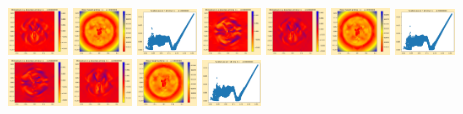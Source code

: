 \documentclass[11pt]{article}
\begin{document}
\includegraphics[width=0.11875\textwidth]{frame0040fig3.png}
\includegraphics[width=0.11875\textwidth]{frame0041fig0.png}
\includegraphics[width=0.11875\textwidth]{frame0041fig1.png}
\includegraphics[width=0.11875\textwidth]{frame0041fig2.png}
\includegraphics[width=0.11875\textwidth]{frame0041fig3.png}
\vskip 10pt 
\includegraphics[width=0.11875\textwidth]{frame0042fig0.png}
\includegraphics[width=0.11875\textwidth]{frame0042fig1.png}
\includegraphics[width=0.11875\textwidth]{frame0042fig2.png}
\includegraphics[width=0.11875\textwidth]{frame0042fig3.png}
\includegraphics[width=0.11875\textwidth]{frame0043fig0.png}
\includegraphics[width=0.11875\textwidth]{frame0043fig1.png}
\end{document}
